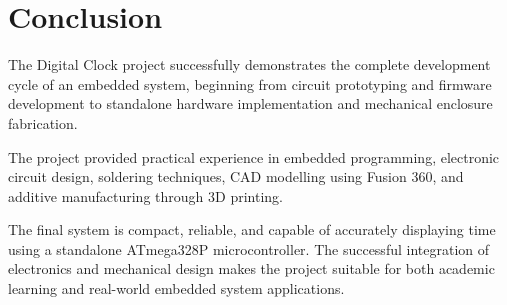\documentclass[12pt,a4paper]{article}
\begin{document}

\section{Conclusion}

The Digital Clock project successfully demonstrates the complete development cycle of an embedded system, beginning from circuit prototyping and firmware development to standalone hardware implementation and mechanical enclosure fabrication.

The project provided practical experience in embedded programming, electronic circuit design, soldering techniques, CAD modelling using Fusion 360, and additive manufacturing through 3D printing.

The final system is compact, reliable, and capable of accurately displaying time using a standalone ATmega328P microcontroller. The successful integration of electronics and mechanical design makes the project suitable for both academic learning and real-world embedded system applications.
\end{document}
